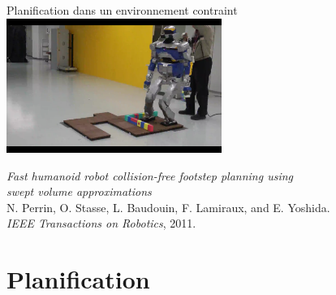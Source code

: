 \documentclass{beamer}
\begin{document}
\begin{frame}
  \begin{center}
    Planification dans un environnement contraint\\
    \vspace{3mm}
    \includegraphics[width=7cm]{./images/img1}\\
  \end{center}

  \begin{center}
    \begin{small}
      \emph{Fast humanoid robot collision-free footstep planning using\\ swept volume approximations}\\
      N. Perrin, O. Stasse, L. Baudouin, F. Lamiraux, and E. Yoshida.\\
      \textit{IEEE Transactions on Robotics}, 2011.
    \end{small}
  \end{center}
\end{frame}

\section{Planification}

\end{document}

